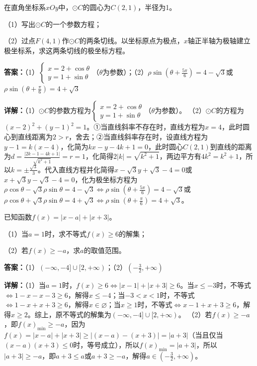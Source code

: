 \begin{question}[points=10]
在直角坐标系$xOy$中，$\odot C$的圆心为$C(2,1)$，半径为1。

（1）写出$\odot C$的一个参数方程；

（2）过点$F(4,1)$作$\odot C$的两条切线。以坐标原点为极点，$x$轴正半轴为极轴建立极坐标系，求这两条切线的极坐标方程。
\begin{solution}
\textbf{答案：}（1）$\begin{cases} x=2+\cos\theta\\ y=1+\sin\theta \end{cases}$（$\theta$为参数）；（2）$\rho\sin(\theta+\frac{5\pi}{6})=4-\sqrt{3}$或$\rho\sin(\theta+\frac{\pi}{6})=4+\sqrt{3}$

\textbf{详解：}（1）$\odot C$的参数方程为$\begin{cases} x=2+\cos\theta\\ y=1+\sin\theta \end{cases}$（$\theta$为参数）。
（2）$\odot C$的方程为$(x-2)^2+(y-1)^2=1$。①当直线斜率不存在时，直线方程为$x=4$，此时圆心到直线距离为$2>r$，舍去；②当直线斜率存在时，设直线方程为$y-1=k(x-4)$，化简为$kx-y-4k+1=0$，此时圆心$C(2,1)$到直线的距离为$d=\frac{|2k-1-4k+1|}{\sqrt{k^2+1}}=r=1$，化简得$2|k|=\sqrt{k^2+1}$，两边平方有$4k^2=k^2+1$，所以$k=\pm\frac{\sqrt3}{3}$。代入直线方程并化简得$x-\sqrt3y+\sqrt3-4=0$或$x+\sqrt3y-\sqrt3-4=0$，化为极坐标方程为$\rho\cos\theta-\sqrt3\rho\sin\theta=4-\sqrt3\Leftrightarrow\rho\sin(\theta+\frac{5\pi}{6})=4-\sqrt3$或$\rho\cos\theta+\sqrt3\rho\sin\theta=4+\sqrt3\Leftrightarrow\rho\sin(\theta+\frac{\pi}{6})=4+\sqrt3$。
\end{solution}
\end{question}

\begin{question}[points=10]
已知函数$f(x)=|x-a|+|x+3|$。

（1）当$a=1$时，求不等式$f(x)\geq6$的解集；

（2）若$f(x)\geq -a$，求$a$的取值范围。
\begin{solution}
\textbf{答案：}（1）$(-\infty,-4]\cup[2,+\infty)$；（2）$\left(-\frac32,+\infty\right)$

\textbf{详解：}（1）当$a=1$时，$f(x)\geq6\Leftrightarrow|x-1|+|x+3|\geq6$。当$x\leq-3$时，不等式$\Leftrightarrow1-x-x-3\geq6$，解得$x\leq-4$；当$-3<x<1$时，不等式$\Leftrightarrow1-x+x+3\geq6$，解得$x\in\varnothing$；当$x\geq1$时，不等式$\Leftrightarrow x-1+x+3\geq6$，解得$x\geq2$。综上，原不等式的解集为$(-\infty,-4]\cup[2,+\infty)$。
（2）若$f(x)\geq -a$，即$f(x)_{\min}\geq -a$，因为$f(x)=|x-a|+|x+3|\geq|(x-a)-(x+3)|=|a+3|$（当且仅当$(x-a)(x+3)\leq0$时，等号成立），所以$f(x)_{\min}=|a+3|$，所以$|a+3|\geq -a$，即$a+3\leq a$或$a+3\geq -a$，解得$a\in\left(-\frac32,+\infty\right)$。
\end{solution}
\end{question}

